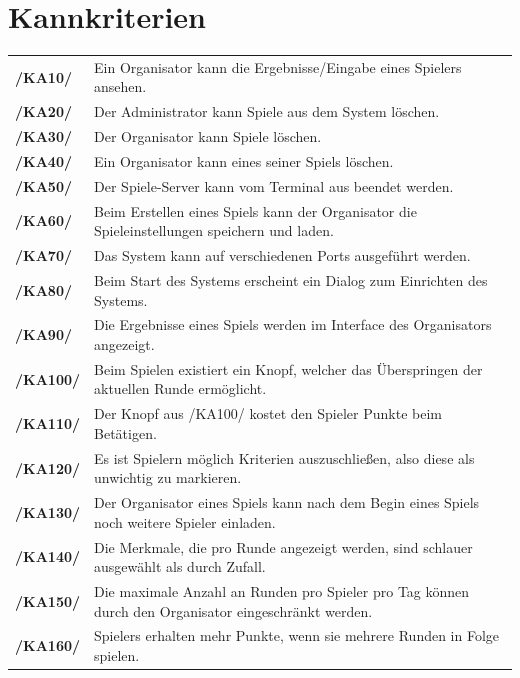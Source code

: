 \documentclass[a4paper]{scrreprt}
\begin{document}
    \section{Kannkriterien}
    \begin{tabularx}{\linewidth}{@{}>{\bfseries}l@{\hspace{.5em}}X@{}} %
        /KA10/ & Ein \Gls{Organisator} kann die Ergebnisse/Eingabe eines Spielers ansehen. \\
        /KA20/ & Der \Gls{Administrator} kann Spiele aus dem System löschen. \\
        /KA30/ & Der \Gls{Organisator} kann Spiele löschen. \\
        /KA40/ & Ein \Gls{Organisator} kann eines seiner \Glspl{Spiel} löschen. \\
        /KA50/ & Der \Gls{Spiele-Server} kann vom Terminal aus beendet werden. \\
        /KA60/ & Beim Erstellen eines Spiels kann der \Gls{Organisator} die \Gls{Spieleinstellungen} speichern und laden. \\
        /KA70/ & Das System kann auf verschiedenen Ports ausgeführt werden. \\
        /KA80/ & Beim Start des Systems erscheint ein Dialog zum Einrichten des Systems. \\
        /KA90/ & Die Ergebnisse eines \Gls{Spiel}s werden im Interface des \Gls{Organisator}s angezeigt. \\
        /KA100/ & Beim Spielen existiert ein Knopf, welcher das Überspringen der aktuellen Runde ermöglicht. \\
        /KA110/ & Der Knopf aus /KA100/ kostet den \Gls{Spieler} Punkte beim Betätigen. \\
        /KA120/ & Es ist \Gls{Spieler}n möglich Kriterien auszuschließen, also diese als unwichtig zu markieren. \\
        /KA130/ & Der \Gls{Organisator} eines Spiels kann nach dem Begin eines Spiels noch weitere Spieler einladen. \\
        /KA140/ & Die Merkmale, die pro Runde angezeigt werden, sind schlauer ausgewählt als durch Zufall. \\ %
        /KA150/ & Die maximale Anzahl an Runden pro Spieler pro Tag können durch den \Gls{Organisator} eingeschränkt werden. \\
        /KA160/ & \Glspl{Spieler} erhalten mehr Punkte, wenn sie mehrere Runden in Folge spielen. \\

\end{tabularx}
\end{document}
